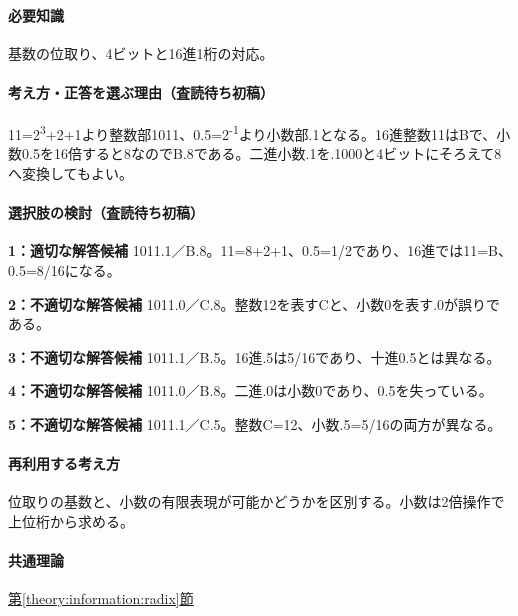 \paragraph{必要知識} 基数の位取り、4ビットと16進1桁の対応。

\paragraph{考え方・正答を選ぶ理由（査読待ち初稿）} 11=\allowbreak{}2\textsuperscript{3}+2+1より整数部1011、0.5=\allowbreak{}2\textsuperscript{-1}より小数部.1となる。16進整数11はBで、小数0.5を16倍すると8なのでB.8である。二進小数.1を.1000と4ビットにそろえて8へ変換してもよい。

\paragraph{選択肢の検討（査読待ち初稿）}\mbox{}\par

\noindent\textbf{1：適切な解答候補} 1011.1／B.8。11=\allowbreak{}8+2+1、0.5=\allowbreak{}1/2であり、16進では11=\allowbreak{}B、0.5=\allowbreak{}8/16になる。\par

\noindent\textbf{2：不適切な解答候補} 1011.0／C.8。整数12を表すCと、小数0を表す.0が誤りである。\par

\noindent\textbf{3：不適切な解答候補} 1011.1／B.5。16進.5は5/16であり、十進0.5とは異なる。\par

\noindent\textbf{4：不適切な解答候補} 1011.0／B.8。二進.0は小数0であり、0.5を失っている。\par

\noindent\textbf{5：不適切な解答候補} 1011.1／C.5。整数C=\allowbreak{}12、小数.5=\allowbreak{}5/16の両方が異なる。\par

\paragraph{再利用する考え方} 位取りの基数と、小数の有限表現が可能かどうかを区別する。小数は2倍操作で上位桁から求める。

\paragraph{共通理論} \hyperref[theory:information:radix]{第\ref*{theory:information:radix}節}

